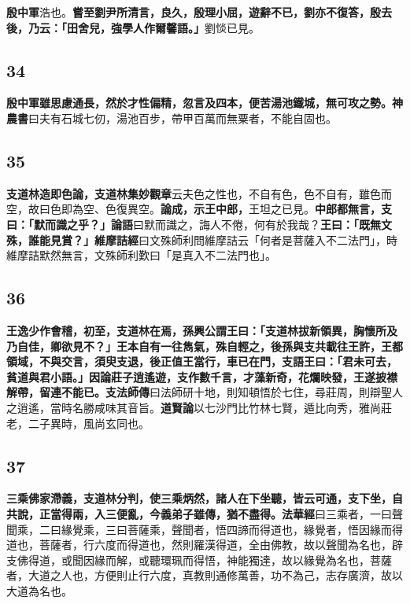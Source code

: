 \textbf{殷中軍}{\footnotesize 浩也。}\textbf{嘗至劉尹所清言，良久，殷理小屈，遊辭不已，劉亦不復答，殷去後，乃云：「田舍兒，強學人作爾馨語。」}{\footnotesize 劉惔已見。}

\subsection*{34}

\textbf{殷中軍雖思慮通長，然於才性偏精，忽言及四本，便苦湯池鐵城，無可攻之勢。}{\footnotesize \textbf{神農書}曰夫有石城七仞，湯池百步，帶甲百萬而無粟者，不能自固也。}

\subsection*{35}

\textbf{支道林造即色論，}{\footnotesize \textbf{支道林集妙觀章}云夫色之性也，不自有色，色不自有，雖色而空，故曰色即為空、色復異空。}\textbf{論成，示王中郎，}{\footnotesize 王坦之已見。}\textbf{中郎都無言，支曰：「默而識之乎？」}{\footnotesize \textbf{論語}曰默而識之，誨人不倦，何有於我哉？}\textbf{王曰：「既無文殊，誰能見賞？」}{\footnotesize \textbf{維摩詰經}曰文殊師利問維摩詰云「何者是菩薩入不二法門」，時維摩詰默然無言，文殊師利歎曰「是真入不二法門也」。}

\subsection*{36}

\textbf{王逸少作會稽，初至，支道林在焉，孫興公謂王曰：「支道林拔新領異，胸懷所及乃自佳，卿欲見不？」王本自有一往雋氣，殊自輕之，後孫與支共載往王許，王都領域，不與交言，須臾支退，後正值王當行，車已在門，支語王曰：「君未可去，貧道與君小語。」因論莊子逍遙遊，支作數千言，才藻新奇，花爛映發，王遂披襟解帶，留連不能已。}{\footnotesize \textbf{支法師傳}曰法師研十地，則知頓悟於七住，尋莊周，則辯聖人之逍遙，當時名勝咸味其音旨。\textbf{道賢論}以七沙門比竹林七賢，遁比向秀，雅尚莊老，二子異時，風尚玄同也。}

\subsection*{37}

\textbf{三乘佛家滯義，支道林分判，使三乘炳然，諸人在下坐聽，皆云可通，支下坐，自共說，正當得兩，入三便亂，今義弟子雖傳，猶不盡得。}{\footnotesize \textbf{法華經}曰三乘者，一曰聲聞乘，二曰緣覺乘，三曰菩薩乘，聲聞者，悟四諦而得道也，緣覺者，悟因緣而得道也，菩薩者，行六度而得道也，然則羅漢得道，全由佛教，故以聲聞為名也，辟支佛得道，或聞因緣而解，或聽環珮而得悟，神能獨達，故以緣覺為名也，菩薩者，大道之人也，方便則止行六度，真教則通修萬善，功不為己，志存廣濟，故以大道為名也。}

